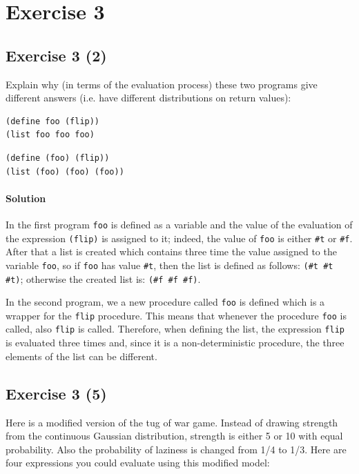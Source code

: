 \section*{Exercise 3}

\subsection*{Exercise 3 (2)}
Explain why (in terms of the evaluation process) these two programs give different answers 
(i.e. have different distributions on return values):
\begin{lstlisting}
(define foo (flip))
(list foo foo foo)
\end{lstlisting}

\begin{lstlisting}
(define (foo) (flip))
(list (foo) (foo) (foo))
\end{lstlisting}    

\paragraph{Solution} 
In the first program \texttt{foo} is defined as a variable and the value of the evaluation of the expression \texttt{(flip)} is
assigned to it; indeed, the value of \texttt{foo} is either \texttt{\#t} or \texttt{\#f}.
After that a list is created which contains three time the value assigned to the variable \texttt{foo}, so if \texttt{foo} has value
\texttt{\#t}, then the list is defined as follows: \texttt{\textquotesingle(\#t \#t \#t)}; otherwise the created list is:
\texttt{\textquotesingle(\#f \#f \#f)}.

In the second program, we a new procedure called \texttt{foo} is defined which is a wrapper for the \texttt{flip} procedure. This means
that whenever the procedure \texttt{foo} is called, also \texttt{flip} is called.
Therefore, when defining the list, the expression \texttt{flip} is evaluated three times and, since it is a non-deterministic 
procedure, the three elements of the list can be different.


\subsection*{Exercise 3 (5)}
Here is a modified version of the tug of war game. Instead of drawing strength from the continuous Gaussian 
distribution, strength is either 5 or 10 with equal probability. Also the probability of laziness is changed from 1/4 to 1/3. 
Here are four expressions you could evaluate using this modified model:

